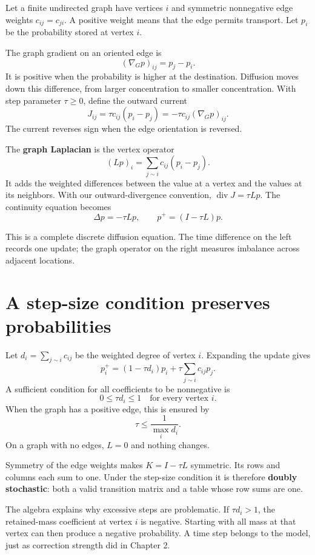 \documentclass[11pt,oneside,openany]{book}
\theoremstyle{definition}
\theoremstyle{remark}
\numberwithin{equation}{chapter}
\begin{document}
Let a finite undirected graph have vertices \(i\) and symmetric nonnegative edge weights \(c_{ij}=c_{ji}\). A positive weight means that the edge permits transport. Let \(p_i\) be the probability stored at vertex \(i\).

The graph gradient on an oriented edge is \[(\nabla_G p)_{ij}=p_j-p_i.\] It is positive when the probability is higher at the destination. Diffusion moves down this difference, from larger concentration to smaller concentration. With step parameter \(\tau\geq0\), define the outward current \[J_{ij}=\tau c_{ij}(p_i-p_j)=-\tau c_{ij}(\nabla_Gp)_{ij}.\] The current reverses sign when the edge orientation is reversed.

The \textbf{graph Laplacian} is the vertex operator \[\boxed{(Lp)_i=\sum_{j\sim i}c_{ij}(p_i-p_j).}\] It adds the weighted differences between the value at a vertex and the values at its neighbors. With our outward-divergence convention, \(\operatorname{div}J=\tau Lp\). The continuity equation becomes \[\boxed{\Delta p=-\tau Lp,\qquad p^+=(I-\tau L)p.}\]

This is a complete discrete diffusion equation. The time difference on the left records one update; the graph operator on the right measures imbalance across adjacent locations.

\section{A step-size condition preserves probabilities}\label{ch10-a-step-size-condition-preserves-probabilities}

Let \(d_i=\sum_{j\sim i}c_{ij}\) be the weighted degree of vertex \(i\). Expanding the update gives \[p_i^+=(1-\tau d_i)p_i+\tau\sum_{j\sim i}c_{ij}p_j.\] A sufficient condition for all coefficients to be nonnegative is \[0\leq\tau d_i\leq1\quad\text{for every vertex }i.\] When the graph has a positive edge, this is ensured by \[\tau\leq\frac1{\max_i d_i}.\] On a graph with no edges, \(L=0\) and nothing changes.

Symmetry of the edge weights makes \(K=I-\tau L\) symmetric. Its rows and columns each sum to one. Under the step-size condition it is therefore \textbf{doubly stochastic}: both a valid transition matrix and a table whose row sums are one.

The algebra explains why excessive steps are problematic. If \(\tau d_i>1\), the retained-mass coefficient at vertex \(i\) is negative. Starting with all mass at that vertex can then produce a negative probability. A time step belongs to the model, just as correction strength did in Chapter 2.
\end{document}
